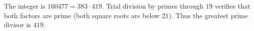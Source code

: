 The integer is $160477=383\cdot419$. Trial division by primes through $19$ verifies that both factors are prime (both square roots are below $21$). Thus the greatest prime divisor is $\boxed{419}$.

